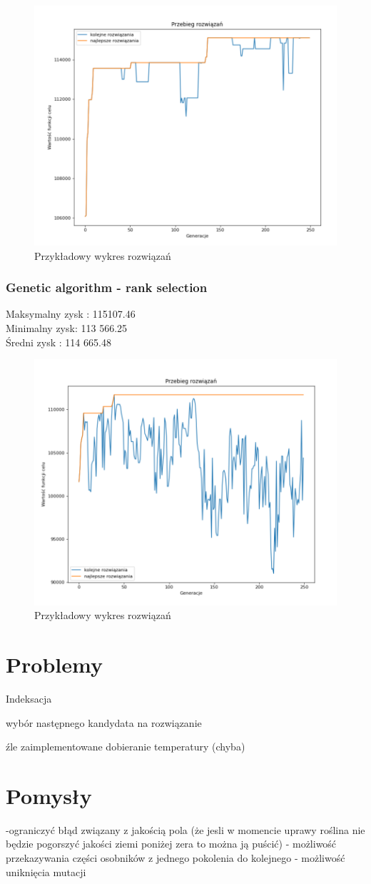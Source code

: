 \documentclass{article}
\begin{document}
\begin{figure}[H]
	\centering
	\includegraphics[width=0.7\linewidth]{screens/ruletka}
	\caption{Przykładowy wykres rozwiązań}
	\label{fig:ruletka}
\end{figure}



\subsubsection{Genetic algorithm - rank selection}
Maksymalny zysk : 115107.46\\
Minimalny zysk: 113 566.25 \\
Średni zysk : 114 665.48

\begin{figure}[H]
	\centering
	\includegraphics[width=0.7\linewidth]{screens/rank.png}
	\caption{Przykładowy wykres rozwiązań}
	\label{fig:rank}
\end{figure}


\section{Problemy}
Indeksacja

wybór następnego kandydata na rozwiązanie

źle zaimplementowane dobieranie temperatury (chyba)
\section{Pomysły}
-ograniczyć błąd związany z jakością pola (że jesli w momencie uprawy roślina nie będzie pogorszyć jakości ziemi poniżej zera to można ją puścić)
- możliwość przekazywania części osobników z jednego pokolenia do kolejnego
- możliwość uniknięcia mutacji
\end{document}
